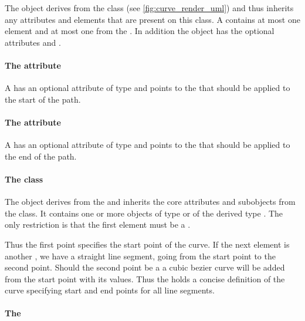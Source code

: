 The \RenderCurve object derives from the \GraphicalPrimitiveOneD class (see \ref{fig:curve_render_uml})
and thus inherits any attributes and elements that are present on this
class.
A \RenderCurve contains at most one \ListOfElements element and at most one  from the \LayoutPackage.
In addition the \RenderCurve object has the optional attributes  and .

\paragraph{The \fixttspace{} attribute}

A \RenderCurve has an optional attribute  of type
 and points to the \LineEnding that should be applied to the start of the path.

\paragraph{The \fixttspace{} attribute}

A \RenderCurve has an optional attribute  of type
 and points to the \LineEnding that should be applied to the end of the path.

\paragraph{The  class}
\label{listofelements-class}

The \ListOfElements object derives from the  and inherits
the core attributes and subobjects from the  class. It
contains one or more objects of type \RenderPoint or of the derived type \RenderCubicBezier. 
The only restriction is that the first element must be a \RenderPoint.

Thus the first point specifies the start point of the curve. If the next element 
is another \RenderPoint, we have a straight line segment, going from the start point 
to the second point. Should the second point be a \RenderCubicBezier a cubic bezier curve 
will be added from the start point with its values. Thus the \ListOfElements holds a concise
definition of the curve specifying start and end points for all line segments. 

\paragraph{The }

